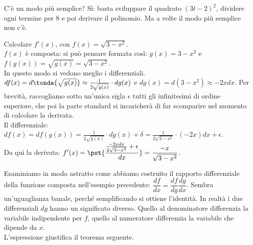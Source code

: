 C'è un modo più semplice? Sì: basta sviluppare il quadrato $(3t-2)^2$, 
dividere
ogni termine per $8$ e poi derivare il polinomio. Ma a volte il modo più 
semplice 
non c'è.
\begin{esempio}
  Calcolare $f'(x)$, con $f(x)=\sqrt{3-x^2}$.\\
  $f(x)$ è composta: si può pensare
  formata così: $g(x)=3-x^2$ e $f(g(x))=\sqrt{g(x)}=\sqrt{3-x^2}$.\\
  In questo modo si vedono meglio i differenziali.
  $df(x)=d\tonda{\sqrt{g(x)}}\approx\frac{1}{2\sqrt{g(x)}}\cdot dg(x)$ e 
  $dg(x)=d(3-x^2)\approx-2xdx$. Per brevità, raccogliamo sotto un'unica
  sigla $\epsilon$ tutti gli infinitesimi 
  di ordine superiore, che poi la parte standard si incaricherà di far 
  scomparire nel momento di calcolare la derivata.\\
  Il differenziale: $df(x)=df(g(x))=\frac{1}{2\sqrt{g(x)}}\cdot 
dg(x)+\delta=
  \frac{1}{2\sqrt{3-x^2}}\cdot (-2x)dx+ \epsilon$.\\
  Da qui la derivata: 
  $f'(x)=\pst{\dfrac{\frac{-2xdx}{2\sqrt{3-x^2}} +\epsilon}{dx}}=
  \dfrac{-x}{\sqrt{3-x^2}}$.
\end{esempio}
Esaminiamo in modo astratto come abbiamo costruito il rapporto 
differenziale della funzione composta nell'esempio precedente: 
$\dfrac{df}{dx}=\dfrac{df}{dg}\dfrac{dg}{dx}$. 
Sembra un'uguaglianza banale, perché semplificando si ottiene
l'identità. In realtà i due differenziali $dg$ hanno un significato
diverso. Quello al denominatore differenzia la variabile indipendente per 
$f$, quello al numeratore differenzia la variabile che dipende da $x$.\\
L'espressione giustifica il teorema seguente.

